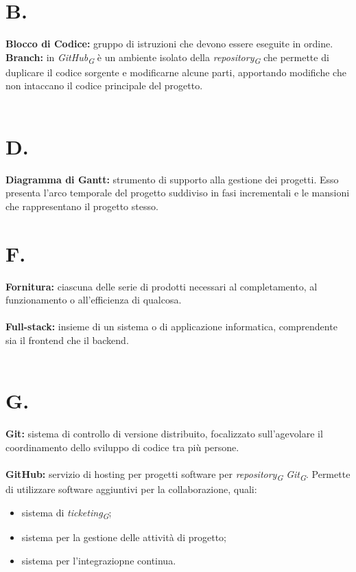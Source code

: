 \documentclass[a4paper, 12pt]{article}
\begin{document}
\makeindexdetails
\makefrontpage \makeversioni
\tableofcontents
\newpage
\clearpage
{}

\section{B.}
\textbf{Blocco di Codice:} gruppo di istruzioni che devono essere eseguite in ordine. \\ 
\textbf{Branch:} in \textit{GitHub\textsubscript{G}} è un ambiente isolato della
\textit{repository\textsubscript{G}} che permette di duplicare il codice
sorgente e modificarne alcune parti, apportando modifiche che non intaccano il codice principale del progetto. \\ \\

\newpage
\section{D.}
\textbf{Diagramma di Gantt:} strumento di supporto alla gestione dei progetti. Esso presenta l'arco temporale del progetto suddiviso in fasi incrementali e le mansioni che rappresentano il progetto stesso. \\

\newpage
\section{F.}
\textbf{Fornitura:} ciascuna delle serie di prodotti necessari al completamento, al funzionamento o all'efficienza di qualcosa. \\ \\
\textbf{Full-stack:} insieme di un sistema o di applicazione informatica, comprendente sia il frontend che il backend.\\ \\

\section{G.}
\textbf{Git:} sistema di controllo di versione distribuito, focalizzato
sull'agevolare il coordinamento dello sviluppo di codice tra più persone. \\ \\
\textbf{GitHub:} servizio di hosting per progetti software per
\textit{repository\textsubscript{G}} \textit{Git\textsubscript{G}}. Permette di
utilizzare software aggiuntivi per la collaborazione, quali:
\begin{itemize}
    \item sistema di \textit{ticketing\textsubscript{G}};
    \item sistema per la gestione delle attività di progetto;
    \item sistema per l'integraziopne continua.
\end{itemize} 
\newpage
\end{document}
